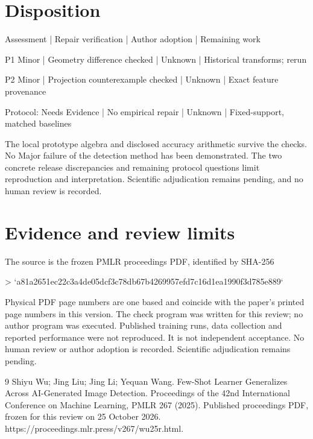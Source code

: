 \documentclass[10pt]{article}
\begin{document}
\section*{Disposition}
Assessment | Repair verification | Author adoption | Remaining work\par
P1 Minor | Geometry difference checked | Unknown | Historical transforms; rerun\par
P2 Minor | Projection counterexample checked | Unknown | Exact feature provenance\par
Protocol: Needs Evidence | No empirical repair | Unknown | Fixed-support, matched baselines\par
The local prototype algebra and disclosed accuracy arithmetic survive the checks. No Major failure of the detection method has been demonstrated. The two concrete release discrepancies and remaining protocol questions limit reproduction and interpretation. Scientific adjudication remains pending, and no human review is recorded.\par
\section*{Evidence and review limits}
The source is the frozen PMLR proceedings PDF, identified by SHA-256\par
> `a81a2651ec22c3a4de05dcf3c78db67b4269957efd7c16d1ea1990f3d785e889`\par
Physical PDF page numbers are one based and coincide with the paper’s printed page numbers in this version. The check program was written for this review; no author program was executed. Published training runs, data collection and reported performance were not reproduced. It is not independent acceptance. No human review or author adoption is recorded. Scientific adjudication remains pending.\par
9 Shiyu Wu; Jing Liu; Jing Li; Yequan Wang. Few-Shot Learner Generalizes Across AI-Generated Image Detection. Proceedings of the 42nd International Conference on Machine Learning, PMLR 267 (2025). Published proceedings PDF, frozen for this review on 25 October 2026. https://proceedings.mlr.press/v267/wu25r.html.\par
\end{document}
